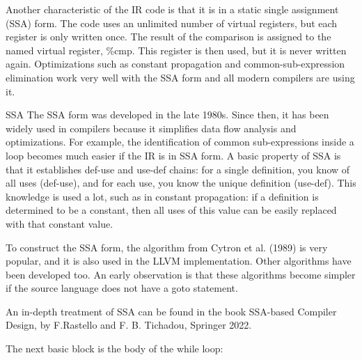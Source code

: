 Another characteristic of the IR code is that it is in a static single assignment (SSA) form. The code uses an unlimited number of virtual registers, but each register is only written once. The result of the comparison is assigned to the named virtual register, \%cmp. This register is then used, but it is never written again. Optimizations such as constant propagation and common-sub-expression elimination work very well with the SSA form and all modern compilers are using it.

\begin{myTip}{SSA}
The SSA form was developed in the late 1980s. Since then, it has been widely used in compilers because it simplifies data flow analysis and optimizations. For example, the identification of common sub-expressions inside a loop becomes much easier if the IR is in SSA form. A basic property of SSA is that it establishes def-use and use-def chains: for a single definition, you know of all uses (def-use), and for each use, you know the unique definition (use-def). This knowledge is used a lot, such as in constant propagation: if a definition is determined to be a constant, then all uses of this value can be easily replaced with that constant value.

To construct the SSA form, the algorithm from Cytron et al. (1989) is very popular, and it is also used in the LLVM implementation. Other algorithms have been developed too. An early observation is that these algorithms become simpler if the source language does not have a goto statement.

An in-depth treatment of SSA can be found in the book SSA-based Compiler Design, by F.Rastello and F. B. Tichadou, Springer 2022.
\end{myTip}

The next basic block is the body of the while loop:



